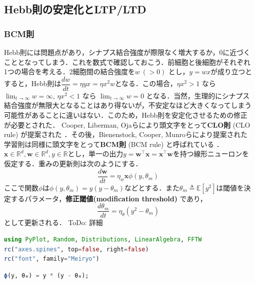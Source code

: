 \subsection{Hebb則の安定化とLTP/LTD}
\subsubsection{BCM則}
Hebb則には問題点があり，シナプス結合強度が際限なく増大するか，0に近づくこととなってしまう．これを数式で確認しておこう．前細胞と後細胞がそれぞれ1つの場合を考える．2細胞間の結合強度を$w\ (>0)$ とし，$y=wx$が成り立つとすると，Hebb則は$\dfrac{dw}{dt}=\eta yx=\eta x^2w$となる．この場合，$\eta x^2>1$ なら $\lim_{t\to\infty} w= \infty$, $\eta x^2<1$ なら $\lim_{t\to\infty} w= 0$ となる．当然，生理的にシナプス結合強度が無限大となることはあり得ないが，不安定なほど大きくなってしまう可能性があることに違いはない．このため，Hebb則を安定化させるための修正が必要とされた．
Cooper, Liberman, Ojaらにより頭文字をとって\textbf{CLO則} (CLO rule) が提案された \citep{Cooper1979-wz}．その後，Bienenstock, Cooper, Munroらにより提案された学習則は同様に頭文字をとって\textbf{BCM則} (BCM rule) と呼ばれている\citep{Bienenstock1982-km} \citep{Cooper2012-ec}．
$\mathbf{x}\in \mathbb{R}^d, \mathbf{w}\in \mathbb{R}^d, y\in \mathbb{R}$とし，単一の出力$y = \mathbf{w}^\top \mathbf{x}=\mathbf{x}^\top \mathbf{w}$を持つ線形ニューロンを仮定する．重みの更新則は次のようにする．
\begin{equation}
\frac{d\mathbf{w}}{dt} = \eta_w \mathbf{x} \phi(y, \theta_m)
\end{equation}
ここで関数$\phi$は$\phi(y, \theta_m)=y(y-\theta_m)$などとする．また$\theta_m\triangleq\mathbb{E}[y^2]$は閾値を決定するパラメータ，\textbf{修正閾値(modification threshold)} であり，
\begin{equation}
\frac{d\theta_m}{dt} = \eta_{\theta} \left(y^2-\theta_m\right)
\end{equation}
として更新される．
ToDo: 詳細
\begin{lstlisting}[language=julia]
using PyPlot, Random, Distributions, LinearAlgebra, FFTW
rc("axes.spines", top=false, right=false)
rc("font", family="Meiryo")
\end{lstlisting}
\begin{lstlisting}[language=julia]
ϕ(y, θₘ) = y * (y - θₘ);
\end{lstlisting}
